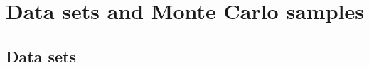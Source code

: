 \clearpage
\section{Data sets and Monte Carlo samples\label{sec:samples}}

\subsection{Data sets\label{sec:datasets}}

%
%

